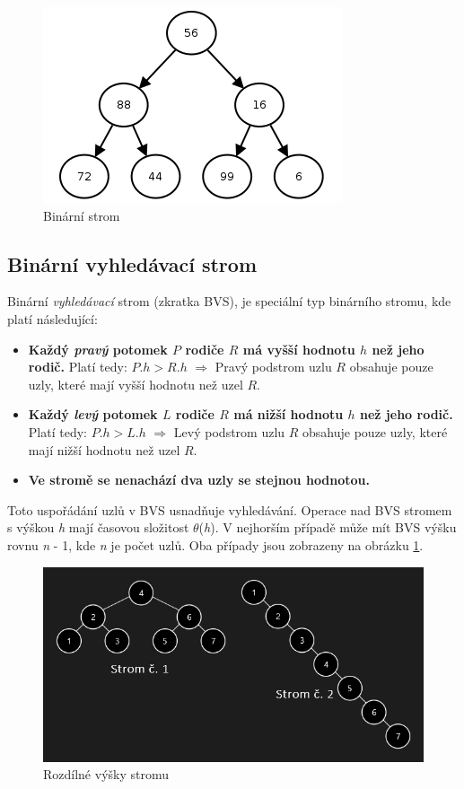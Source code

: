 \documentclass[
  biblatex=false,
  font=serif,
  glossaries=false,
  tables=false,
  theorems=false,
  index
]{kidiplom}
\begin{document}
\begin{figure}[h!]
\centering
	\includegraphics[scale=0.9]{obrazky/3BinarniStrom.png}
	\caption{Binární strom}
\end{figure}


\medskip
\subsection{Binární vyhledávací strom}
\indent\indent Binární \textit{vyhledávací} strom (zkratka BVS), je speciální typ binárního stromu, kde platí následující:
\begin{itemize}
\item \textbf {Každý \textit{pravý} potomek $P$ rodiče $R$ má vyšší hodnotu $h$ než jeho rodič.} Platí tedy: $P.h > R.h$ $\Rightarrow$ Pravý podstrom uzlu $R$ obsahuje pouze uzly, které mají vyšší hodnotu než uzel $R$. 
\item \textbf {Každý \textit{levý} potomek $L$ rodiče $R$ má nižší hodnotu $h$ než jeho rodič.} Platí tedy: $P.h > L.h$ $\Rightarrow$ Levý podstrom uzlu $R$ obsahuje pouze uzly, které mají nižší hodnotu než uzel $R$. 
\item \textbf {Ve stromě se nenachází dva uzly se stejnou hodnotou.}
\end{itemize} 

\noindent Toto uspořádání uzlů v BVS usnadňuje vyhledávání. Operace nad BVS stromem s výškou \textit{h}  mají časovou složitost $ \theta$(\textit{h}). V nejhorším případě může mít BVS výšku rovnu \textit{n} - 1, kde \textit{n} je počet uzlů. Oba případy jsou zobrazeny na obrázku \ref{binary}.

\begin{figure}[h!]
\centering
	\includegraphics[scale=0.7]{obrazky/4BinarniVyhledavaciStrom.png}
	\caption{Rozdílné výšky stromu}
	\label{binary}
\end{figure}
\end{document}
